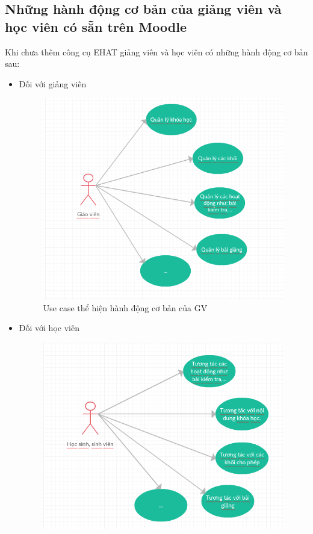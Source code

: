 \subsection{Những hành động cơ bản của giảng viên và học viên có sẵn trên Moodle}
Khi chưa thêm công cụ EHAT giảng viên và học viên có những hành động cơ bản sau:
\begin{itemize}
	\item Đối với giảng viên
	\begin{center}
		\begin{figure}[htp]
			\begin{center}
				\includegraphics[scale=0.7]{img/usecasegv}
			\end{center}
			\caption{Use case \cite{usecase:1} thể hiện hành động cơ bản của GV}
			\label{refhinh10}
		\end{figure}
	\end{center}
	\vskip 4cm 
	\item Đối với học viên
	\begin{center}
		\begin{figure}[htp]
			\begin{center}
				\includegraphics[scale=0.7]{img/usecasehs}

\end{center}
\end{figure}
\end{center}
\end{itemize}
